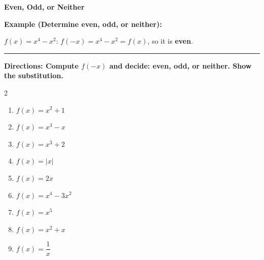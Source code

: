 \documentclass[12pt]{article}
\begin{document}
\vspace{0.35cm}

\begin{center}{\Large \textbf{Even, Odd, or Neither}}\end{center}\vspace{0.2cm}
\textbf{Example (Determine even, odd, or neither):}

$f(x)=x^{4}-x^{2}$: $f(-x)=x^{4}-x^{2}=f(x)$, so it is \textbf{even}.

\vspace{0.2cm}\hrule\vspace{0.35cm}
\textbf{Directions: Compute $f(-x)$ and decide: even, odd, or neither. Show the substitution.}

\begin{multicols}{2}
\begin{enumerate}[label=\textbf{\arabic*.}, start=1, itemsep=2cm]
  \item $\displaystyle f(x)=x^{2}+1$
  \item $\displaystyle f(x)=x^{3}-x$
  \item $\displaystyle f(x)=x^{3}+2$
  \item $\displaystyle f(x)=|x|$
  \item $\displaystyle f(x)=2x$
  \item $\displaystyle f(x)=x^{4}-3x^{2}$
  \item $\displaystyle f(x)=x^{5}$
  \item $\displaystyle f(x)=x^{2}+x$
  \item $\displaystyle f(x)=\dfrac{1}{x}$
\end{enumerate}
\end{multicols}
\end{document}
